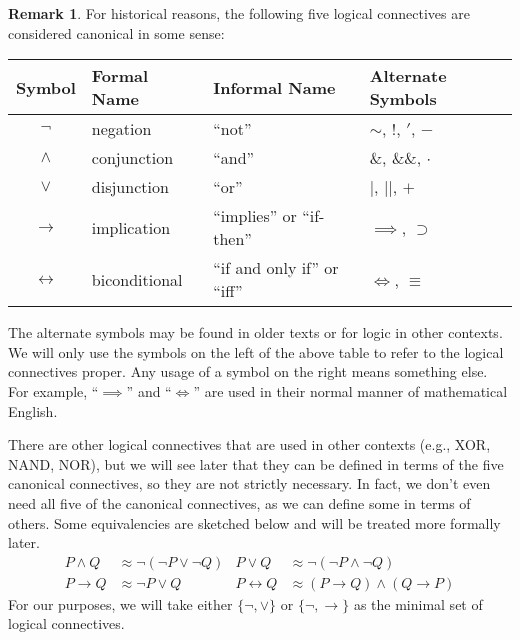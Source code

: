 \documentclass[12pt]{article}
\theoremstyle{definition}
\newtheorem{remark}[theorem]{Remark}
\newcommand{\<}{\langle}
\renewcommand{\>}{\rangle}
\newcommand{\liff}{\leftrightarrow}
\begin{document}
\begin{remark}
    For historical reasons, the following five logical connectives are considered canonical in some sense:
    \begin{center}
        \begin{tabular}{clll}
            Symbol & Formal Name & Informal Name & Alternate Symbols\\
            \hline
            $\lnot$ & negation & ``not'' & $\sim$, $!$, $'$, $-$ \\ 
            $\land$ & conjunction & ``and'' & $\&$, $\&\&$, $\cdot$ \\ 
            $\lor$ & disjunction & ``or'' & $|$, $||$, $+$ \\ 
            $\to$ & implication & ``implies'' or ``if-then'' & $\implies$, $\supset$ \\
            $\liff$ & biconditional & ``if and only if'' or ``iff'' & $\iff$, $\equiv$
        \end{tabular}
    \end{center}
    The alternate symbols may be found in older texts or for logic in other contexts.
    We will only use the symbols on the left of the above table to refer to the logical connectives proper.
    Any usage of a symbol on the right means something else.
    For example, ``$\implies$'' and ``$\iff$'' are used in their normal manner of mathematical English.

    There are other logical connectives that are used in other contexts (e.g., XOR, NAND, NOR), but we will see later that they can be defined in terms of the five canonical connectives, so they are not strictly necessary.
    In fact, we don't even need all five of the canonical connectives, as we can define some in terms of others.
    Some equivalencies are sketched below and will be treated more formally later.
    \begin{align*}
        P \land Q &\approx \lnot(\lnot P \lor \lnot Q)
            & P \lor Q &\approx \lnot(\lnot P \land \lnot Q) \\
        P \to Q &\approx \lnot P \lor Q
            & P \liff Q &\approx (P \to Q) \land (Q \to P)
    \end{align*}
    For our purposes, we will take either $\{\lnot, \lor\}$ or $\{\lnot, \to\}$ as the minimal set of logical connectives.
\end{remark}
\end{document}
